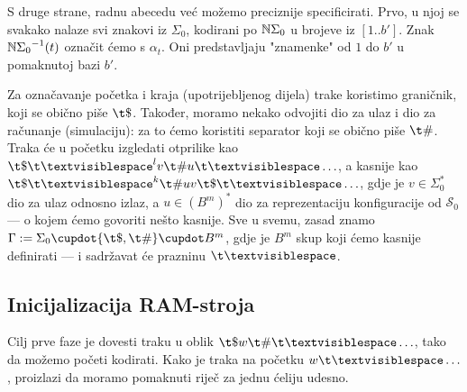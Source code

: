 S druge strane, radnu abecedu već možemo preciznije specificirati. Prvo, u njoj se svakako nalaze svi znakovi iz $\Sigma_0$, kodirani po ${\mathbb N}\Sigma_0$ u brojeve iz $[1..b']$. Znak ${{\mathbb N}\Sigma_0}^{-1}(t)$ označit ćemo s $\alpha_t$. Oni predstavljaju "znamenke" od $1$ do $b'$ u pomaknutoj bazi $b'$. 

Za označavanje početka i kraja (upotrijebljenog dijela) trake koristimo graničnik, koji se obično piše $\t\$$. Također, moramo nekako odvojiti dio za ulaz i dio za računanje (simulaciju): za to ćemo koristiti separator koji se obično piše $\t\#$. Traka će u početku izgledati otprilike kao $\t\$\bl^lv\t\#u\bl\ldots$, a kasnije kao $\t\$\bl^k\t\#uv\t\$\bl\ldots$, gdje je $v\in\Sigma_0^*$ dio za ulaz odnosno izlaz, a $u\in(B^m)^*$ dio za reprezentaciju konfiguracije od $\mathcal S_0$ --- o kojem ćemo govoriti nešto kasnije. Sve u svemu, zasad znamo
    $\Gamma:=\Sigma_0\dcup\{\t\$,\t\#\}\dcup B^m$,
gdje je $B^m$ skup koji ćemo kasnije definirati --- i sadržavat će prazninu $\bl$.

\subsection{Inicijalizacija RAM-stroja}

Cilj prve faze je dovesti traku u oblik $\t\$w\t\#\bl\ldots$, tako da možemo početi kodirati. Kako je traka na početku $w\bl\ldots$, proizlazi da moramo pomaknuti riječ za jednu ćeliju udesno.

